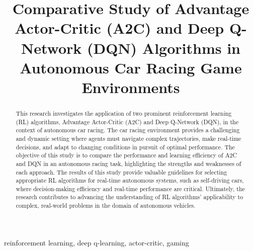 \documentclass[conference]{IEEEtran}
\begin{document}
\title{Comparative Study of Advantage Actor-Critic (A2C) and Deep Q-Network (DQN) Algorithms in Autonomous Car Racing Game Environments}


\author{%
    
    \and%
    
}
\maketitle
\begin{abstract}
This research investigates the application of two prominent reinforcement learning (RL) algorithms, Advantage Actor-Critic (A2C) and Deep Q-Network (DQN), in the context of autonomous car racing. The car racing environment provides a challenging and dynamic setting where agents must navigate complex trajectories, make real-time decisions, and adapt to changing conditions in pursuit of optimal performance. The objective of this study is to compare the performance and learning efficiency of A2C and DQN in an autonomous racing task, highlighting the strengths and weaknesses of each approach. The results of this study provide valuable guidelines for selecting appropriate RL algorithms for real-time autonomous systems, such as self-driving cars, where decision-making efficiency and real-time performance are critical. Ultimately, the research contributes to advancing the understanding of RL algorithms' applicability to complex, real-world problems in the domain of autonomous vehicles.
\end{abstract}

\begin{IEEEkeywords}
reinforcement learning, deep q-learning, actor-critic, gaming
\end{IEEEkeywords}
\end{document}
